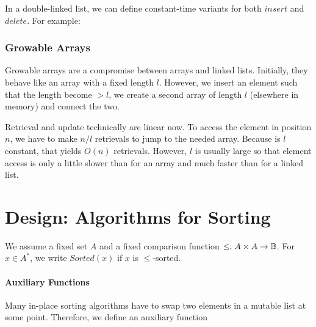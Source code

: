 In a double-linked list, we can define constant-time variants for both $insert$ and $delete$.
For example:
\begin{acode}
\end{acode}


\subsubsection{Growable Arrays}

Growable arrays are a compromise between arrays and linked lists.
Initially, they behave like an array with a fixed length $l$.
However, we insert an element such that the length become $>l$, we create a second array of length $l$ (elsewhere in memory) and connect the two.

Retrieval and update technically are linear now.
To access the element in position $n$, we have to make $n/l$ retrievals to jump to the needed array.
Because is $l$ constant, that yields $O(n)$ retrievals.
However, $l$ is usually large so that element access is only a little slower than for an array and much faster than for a linked list.

\section{Design: Algorithms for Sorting}\label{sec:ad:sort:algo}

We assume a fixed set $A$ and a fixed comparison function $\leq:A\times A \to \mathbb{B}$.
For $x\in A^*$, we write $Sorted(x)$ if $x$ is $\leq$-sorted.

\paragraph{Auxiliary Functions}
Many in-place sorting algorithms have to swap two elements in a mutable list at some point.
Therefore, we define an auxiliary function

\begin{acode}
\end{acode}

